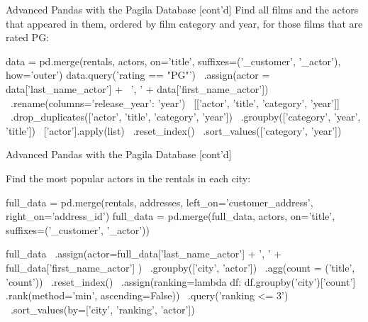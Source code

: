 \documentclass[ignorenonframetext,xcolor=x11names]{beamer}
\begin{document}
\begin{frame}[label=full,fragile]{Advanced Pandas with the Pagila Database  \small [cont'd]}
Find all films and the actors that appeared in them, ordered by film category and year, for those films that are rated PG:

\scriptsize
\begin{pythoncode}
data = pd.merge(rentals, actors, on='title', 
         suffixes=('_customer', '_actor'), how='outer')
data.query('rating == "PG"') \
    .assign(actor = data['last_name_actor'] + \
                   ', ' + data['first_name_actor']) \
    .rename(columns={'release_year': 'year'}) \
    [['actor', 'title', 'category', 'year']] \
    .drop_duplicates(['actor', 'title', 'category', 'year']) \
    .groupby(['category', 'year', 'title']) \
    ['actor'].apply(list) \
    .reset_index() \
    .sort_values(['category', 'year']) \
\end{pythoncode}
\end{frame}


\begin{frame}[label=full,fragile]{Advanced Pandas with the Pagila Database \small [cont'd]}

Find the most popular actors in the rentals in each city:

\scriptsize
\begin{pythoncode}
full_data = pd.merge(rentals, addresses, 
                     left_on='customer_address', 
                     right_on='address_id')
full_data = pd.merge(full_data, actors, on='title', 
                     suffixes=('_customer', '_actor'))
\end{pythoncode}

\begin{pythoncode}
full_data \
   .assign(actor=full_data['last_name_actor'] + ', ' + 
                 full_data['first_name_actor'] ) \
   .groupby(['city', 'actor']) \
   .agg(count = ('title', 'count')) \
   .reset_index() \
   .assign(ranking=lambda df: 
      df.groupby('city')['count']
        .rank(method='min', ascending=False)) \
   .query('ranking <= 3') \
   .sort_values(by=['city', 'ranking', 'actor'])
\end{pythoncode}

\end{frame}
\end{document}
